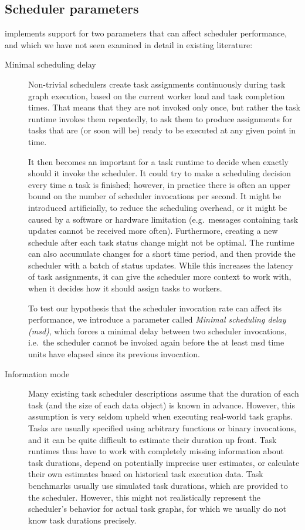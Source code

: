 \subsection{Scheduler parameters}
\estee{} implements support for two parameters that can affect scheduler
performance, and which we have not seen examined in detail in existing literature:
\begin{description}
	\item[Minimal scheduling delay] Non-trivial schedulers create task assignments continuously during task graph execution, based on
		the current worker load and task completion times. That means that they are not invoked only once,
		but rather the task runtime invokes them repeatedly, to ask them to produce assignments for tasks
		that are (or soon will be) ready to be executed at any given point in time.

		It then becomes an important for a task runtime to decide when exactly should it invoke the
		scheduler. It could try to make a scheduling decision every time a task is finished; however, in
		practice there is often an upper bound on the number of scheduler invocations per second. It might
		be introduced artificially, to reduce the scheduling overhead, or it might be caused by a software
		or hardware limitation (e.g.\ messages containing task updates cannot be received more often).
		Furthermore, creating a new schedule after each task status change might not be optimal. The
		runtime can also accumulate changes for a short time period, and then provide the scheduler with a
		batch of status updates. While this increases the latency of task assignments, it can give the
		scheduler more context to work with, when it decides how it should assign tasks to workers.

		To test our hypothesis that the scheduler invocation rate can affect its performance, we introduce
		a parameter called \emph{Minimal scheduling delay (\acrshort{msd})}, which forces a minimal delay between two scheduler
		invocations, i.e.\ the scheduler cannot be invoked again before the at least
		\gls{msd} time units have elapsed since its previous invocation.
	\item[Information mode] Many existing task scheduler descriptions assume that the duration of each task (and the size of
		each data object) is known in advance. However, this assumption is very seldom upheld when
		executing real-world task graphs. Tasks are usually specified using arbitrary functions or binary
		invocations, and it can be quite difficult to estimate their duration up front. Task runtimes thus
		have to work with completely missing information about task durations, depend on potentially
		imprecise user estimates, or calculate their own estimates based on historical task execution data.
		Task benchmarks usually use simulated task durations, which are provided to the scheduler. However,
		this might not realistically represent the scheduler's behavior for actual task graphs, for which
		we usually do not know task durations precisely.


\end{description}
